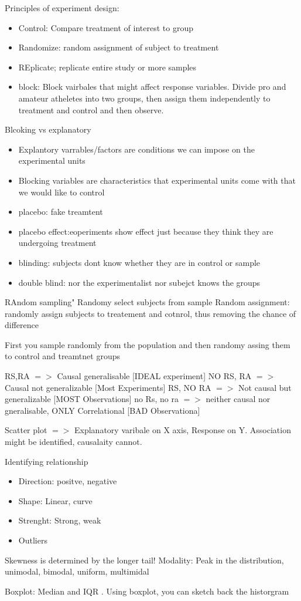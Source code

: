 \documentclass[a4paper]{article}
\begin{document}
Principles of experiment design:\\
\begin{itemize}
\item Control: Compare treatment of interest to group
\item Randomize: random assignment of subject to treatment
\item REplicate; replicate entire study or more samples 
\item block: Block vairbales that might affect response variables. Divide pro and amateur atheletes into two groups, then assign them independently to treatment and control and then observe.
\end{itemize}
Blcoking vs explanatory
\begin{itemize}
\item Explantory varrables/factors are conditions we can impose on the experimental units
\item Blocking variables are characteristics that experimental units 	come with that we would like to control
\end{itemize}
\begin{itemize}
\item placebo: fake treamtent
\item placebo effect:eoperiments show effect just because they think they are undergoing treatment
\item blinding: subjects dont know whether they are in control or sample
\item double blind: nor the experimentalist nor subejct knows the groups
\end{itemize}


RAndom sampling" Randomy select subjects from sample
Random assignment: randomly assign subjects to treatement and cotnrol, thus removing the chance of difference

First you sample randomly from the population and then randomy assing them to control and treamtnet groups

RS,RA $=>$ Causal  generalisable [IDEAL experiment]
NO RS, RA $=>$ Causal not generalizable [Most Experiments]
RS, NO RA $=>$ Not causal but generalizable [MOST Observations]
no Rs, no ra $=>$ neither causal nor gneralisable, ONLY Correlational [BAD Observationa]

Scatter plot $=>$ Explanatory varibale on X axis, Response on Y. Association might be identified, causalaity cannot.

Identifying relationship
\begin{itemize}
\item Direction: positve, negative
\item Shape: Linear, curve
\item Strenght: Strong, weak
\item Outliers
\end{itemize}

Skewness is determined by the longer tail!
Modality: Peak in the distribution, unimodal, bimodal, uniform, multimidal

Boxplot: Median and IQR . Using boxplot, you can sketch back the historgram
\end{document}
